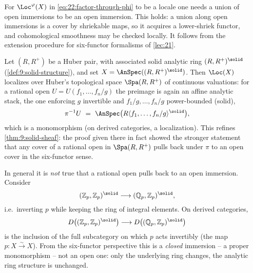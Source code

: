 \begin{remark}
\label{rmk:22:union-open}
For $\Loc^{\varphi}(X)$ in \eqref{eq:22:factor-through-phi} to be a locale one
needs a union of open immersions to be an open immersion. This holds: a union
along open immersions is a cover by shriekable maps, so it acquires a
lower-shriek functor, and cohomological smoothness may be checked locally. It
follows from the extension procedure for six-functor formalisms of
\cref{lec:21}.
\end{remark}

\begin{example}
\label{ex:22:huber-locale}
Let $(R,R^+)$ be a Huber pair, with associated solid analytic ring
$(R,R^+)^\solid$ (\cref{def:9:solid-structure}), and set $X=\AnSpec((R,R^+)^
\solid)$. Then $\Loc(X)$ localizes over Huber's topological space
$\Spa(R,R^+)$ of continuous valuations: for a rational open
$U=U(f_1,\dots,f_n/g)$ the preimage is again an affine analytic stack, the one
enforcing $g$ invertible and $f_1/g,\dots,f_n/g$ power-bounded (solid),
\begin{equation*}
\pi^{-1}U\ =\ \AnSpec\bigl(R\langle f_1,\dots,f_n/g\rangle^\solid\bigr),
\end{equation*}
which is a monomorphism (on derived categories, a localization). This refines
\cref{thm:9:solid-sheaf}: the proof given there in fact showed the stronger
statement that any cover of a rational open in $\Spa(R,R^+)$ pulls back under
$\pi$ to an open cover in the six-functor sense.
\end{example}

\begin{remark}
\label{rmk:22:warning-rational-open}
In general it is \emph{not} true that a rational open pulls back to an open
immersion. Consider
\begin{equation*}
(\mathbb Z_p,\mathbb Z_p)^\solid\longrightarrow(\mathbb Q_p,\mathbb Z_p)^\solid,
\end{equation*}
i.e.\ inverting $p$ while keeping the ring of integral elements. On derived
categories,
\begin{equation*}
D\bigl((\mathbb Z_p,\mathbb Z_p)^\solid\bigr)\longrightarrow
D\bigl((\mathbb Q_p,\mathbb Z_p)^\solid\bigr)
\end{equation*}
is the inclusion of the full subcategory on which $p$ acts invertibly (the map
$p\colon X\xrightarrow{\sim}X$). From the six-functor perspective this is a
\emph{closed} immersion -- a proper monomorphism -- not an open one: only the
underlying ring changes, the analytic ring structure is unchanged.
\end{remark}

